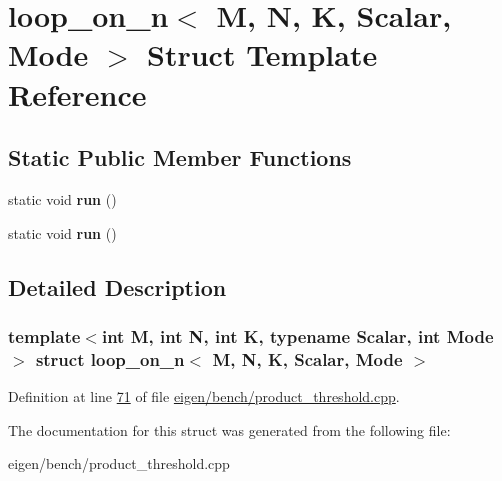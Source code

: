 \hypertarget{structloop__on__n}{}\section{loop\+\_\+on\+\_\+n$<$ M, N, K, Scalar, Mode $>$ Struct Template Reference}
\label{structloop__on__n}
\subsection*{Static Public Member Functions}
\begin{DoxyCompactItemize}
\item 
\mbox{\label{structloop__on__n_a5b37014688c83c2c42383a2d0165d586}} 
static void {\bfseries run} ()
\item 
\mbox{\label{structloop__on__n_a5b37014688c83c2c42383a2d0165d586}} 
static void {\bfseries run} ()
\end{DoxyCompactItemize}


\subsection{Detailed Description}
\subsubsection*{template$<$int M, int N, int K, typename Scalar, int Mode$>$\newline
struct loop\+\_\+on\+\_\+n$<$ M, N, K, Scalar, Mode $>$}



Definition at line \hyperlink{eigen_2bench_2product__threshold_8cpp_source_l00071}{71} of file \hyperlink{eigen_2bench_2product__threshold_8cpp_source}{eigen/bench/product\+\_\+threshold.\+cpp}.



The documentation for this struct was generated from the following file\+:\begin{DoxyCompactItemize}
\item 
eigen/bench/product\+\_\+threshold.\+cpp\end{DoxyCompactItemize}
